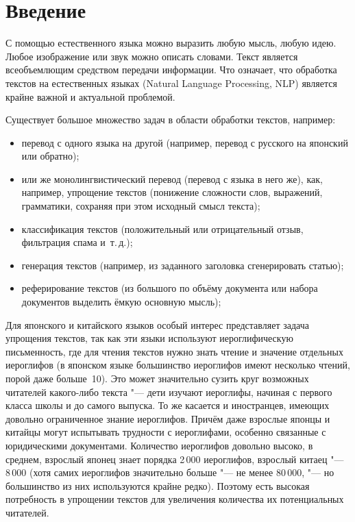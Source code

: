\chapter*{Введение} %

С помощью естественного языка можно выразить любую мысль, любую идею.
Любое изображение или звук можно описать словами.
Текст является всеобъемлющим средством передачи информации.
Что означает, что обработка текстов на естественных языках (Natural Language Processing, NLP) является крайне важной и актуальной проблемой.

Существует большое множество задач в области обработки текстов, например:
\begin{itemize}%
  \item перевод с одного языка на другой (например, перевод с русского на японский или обратно);
  \item или же монолингвистический перевод (перевод с языка в него же),  как, например, упрощение текстов (понижение сложности слов, выражений, грамматики, сохраняя при этом исходный смысл текста);
  \item классификация текстов (положительный или отрицательный отзыв, фильтрация спама и~т.\,д.);
  \item генерация текстов (например, из заданного заголовка сгенерировать статью);
  \item реферирование текстов (из большого по объёму документа или набора документов выделить ёмкую основную мысль);
\end{itemize}

Для японского и китайского языков особый интерес представляет задача упрощения текстов, так как эти языки используют иероглифическую письменность, где для чтения текстов нужно знать чтение и значение отдельных иероглифов (в японском языке большинство иероглифов имеют несколько чтений, порой даже больше~10).
Это может значительно сузить круг возможных читателей какого-либо текста "--- дети изучают иероглифы, начиная с первого класса школы и до самого выпуска.
То же касается и иностранцев, имеющих довольно ограниченное знание иероглифов.
Причём даже взрослые японцы и китайцы могут испытывать трудности с иероглифами, особенно связанные с юридическими документами.
Количество иероглифов довольно высоко, в среднем, взрослый японец знает порядка 2\,000 иероглифов, взрослый китаец "--- 8\,000 (хотя самих иероглифов значительно больше "--- не менее 80\,000, "--- но большинство из них используются крайне редко).
Поэтому есть высокая потребность в упрощении текстов для увеличения количества их потенциальных читателей.

